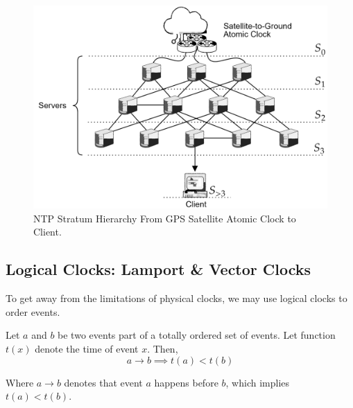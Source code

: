 \vspace{-1em}
\begin{figure}[h]
    \includegraphics[width=.9\textwidth]{./Sections/time/sat.png}
    \caption{NTP Stratum Hierarchy From GPS Satellite Atomic Clock to Client.}
\end{figure}

\newpage 
\subsection{Logical Clocks: Lamport \& Vector Clocks}

\noindent
To get away from the limitations of physical clocks, we may use logical clocks to order events.

\begin{Def}

    Let $a$ and $b$ be two events part of a totally ordered set of events. Let function $t(x)$ denote the time of event $x$. Then,
    \[ a \rightarrow b \implies t(a) < t(b) \]

    \noindent
    Where $a \rightarrow b$ denotes that event $a$ happens before $b$, which implies $t(a) < t(b)$.
\end{Def}

